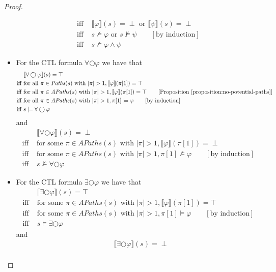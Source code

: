 \documentclass[12pt]{article}
\newcommand{\nxt}{\bigcirc}
\theoremstyle{definition}
\newcommand{\comment}[1]{\hspace{2em}[\mbox{#1}]}
\newcommand{\satisfaction}[1]{\llbracket #1 \rrbracket}
\begin{document}
\begin{proof}
\begin{itemize}
\begin{align*}
\mbox{iff } & \satisfaction{\varphi}(s) = \perp \mbox{ or } \satisfaction{\psi}(s) = \perp\\
\mbox{iff } & s \not\models \varphi \mbox{ or } s \not\models \psi
\comment{by induction}\\
\mbox{iff } & s \not\models \varphi \wedge \psi
\end{align*}
\item
For the CTL formula $\forall \nxt \varphi$ we have that
\begin{align*}
& \satisfaction{\forall \nxt \varphi}(s) = \top\\
\mbox{iff } & \mbox{for all } \pi \in \mathit{Paths}(s) \mbox{ with } |\pi| > 1, \satisfaction{\varphi}(\pi[1]) = \top\\
\mbox{iff } & \mbox{for all } \pi \in \mathit{APaths}(s) \mbox{ with } |\pi| > 1, \satisfaction{\varphi}(\pi[1]) = \top
\comment{Proposition~\ref{proposition:no-potential-paths}}\\
\mbox{iff } & \mbox{for all } \pi \in \mathit{APaths}(s) \mbox{ with } |\pi| > 1, \pi[1] \models \varphi
\comment{by induction}\\
\mbox{iff } & s \models \forall \nxt \varphi
\end{align*}
and
\begin{align*}
& \satisfaction{\forall \nxt \varphi}(s) = \perp\\
\mbox{iff } & \mbox{for some } \pi \in \mathit{APaths}(s) \mbox{ with } |\pi| > 1, \satisfaction{\varphi}(\pi[1]) = \perp\\
\mbox{iff } & \mbox{for some } \pi \in \mathit{APaths}(s) \mbox{ with } |\pi| > 1, \pi[1] \not\models \varphi
\comment{by induction}\\
\mbox{iff } & s \not\models \forall \nxt \varphi
\end{align*}
\item
For the CTL formula $\exists \nxt \varphi$ we have that
\begin{align*}
& \satisfaction{\exists \nxt \varphi}(s) = \top\\
\mbox{iff } & \mbox{for some } \pi \in \mathit{APaths}(s) \mbox{ with } |\pi| > 1, \satisfaction{\varphi}(\pi[1]) = \top\\
\mbox{iff } & \mbox{for some } \pi \in \mathit{APaths}(s) \mbox{ with } |\pi| > 1, \pi[1] \models \varphi
\comment{by induction}\\
\mbox{iff } & s \models \exists \nxt \varphi
\end{align*}
and
\begin{align*}
& \satisfaction{\exists \nxt \varphi}(s) = \perp\\

\end{align*}
\end{itemize}
\end{proof}
\end{document}
